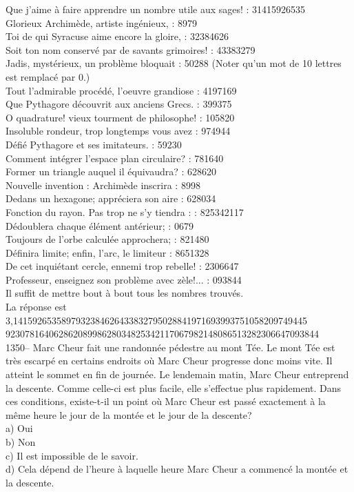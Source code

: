 ﻿\documentclass[letterpaper, 12pt]{article}
\begin{document}
Que j'aime \`a faire apprendre un nombre utile aux sages! : 31415926535\\
Glorieux Archim\`ede, artiste ing\'enieux, : 8979\\
Toi de qui Syracuse aime encore la gloire, : 32384626\\
Soit ton nom conserv\'e par de savants grimoires! : 43383279\\
Jadis, myst\'erieux, un probl\`eme bloquait : 50288  (Noter qu'un mot de 10
lettres est remplac\'e par 0.)\\
Tout l'admirable proc\'ed\'e, l'oeuvre grandiose : 4197169\\
Que Pythagore d\'ecouvrit aux anciens Grecs. : 399375\\
O quadrature! vieux tourment de philosophe! : 105820\\
Insoluble rondeur, trop longtemps vous avez : 974944\\
D\'efi\'e Pythagore et ses imitateurs. : 59230\\
Comment int\'egrer l'espace plan circulaire? : 781640\\
Former un triangle auquel il \'equivaudra? : 628620\\
Nouvelle invention : Archim\`ede inscrira : 8998\\
Dedans un hexagone; appr\'eciera son aire : 628034\\
Fonction du rayon. Pas trop ne s'y tiendra : : 825342117\\
D\'edoublera chaque \'el\'ement ant\'erieur; : 0679\\
Toujours de l'orbe calcul\'ee approchera; : 821480\\
D\'efinira limite; enfin, l'arc, le limiteur : 8651328\\
De cet inqui\'etant cercle, ennemi trop rebelle! : 2306647\\
Professeur, enseignez son probl\`eme avec z\`ele!... : 093844\\

Il suffit de mettre bout \`a bout tous les nombres trouv\'es.\\

La r\'eponse est\\
3,1415926535897932384626433832795028841971693993751058209749445\\
92307816406286208998628034825342117067982148086513282306647093844\\

1350-- Marc Cheur fait une randonn\'ee p\'edestre au mont T\'ee.  Le mont
T\'ee est tr\`es escarp\'e en certains endroits o\`u Marc Cheur progresse
donc moins vite.  Il atteint le sommet en fin de journ\'ee.  Le lendemain
matin, Marc Cheur entreprend la descente.  Comme celle-ci est plus facile,
elle s'effectue plus rapidement.  Dans ces conditions, existe-t-il un point
o\`u Marc Cheur est pass\'e exactement \`a la m\^eme heure le jour de la
mont\'ee et le jour de la descente?\\
a) Oui\\
b) Non\\
c) Il est impossible de le savoir.\\
d) Cela d\'epend de l'heure \`a laquelle heure Marc Cheur a commenc\'e la
mont\'ee et la descente.\\
\end{document}

